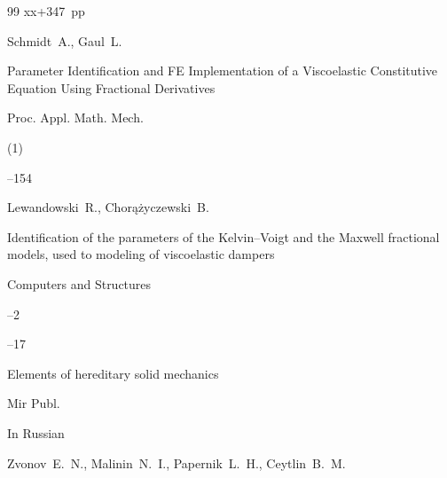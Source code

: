 \documentclass[11pt,a4paper,twoside]{article}
\begin{document}
\begin{thebibliography}{99}
\totalpages xx+347~pp











\by Schmidt~A., Gaul~L.


\paper Parameter Identification and FE Implementation of a Viscoelastic Constitutive Equation Using Fractional Derivatives


\jour Proc. Appl. Math. Mech.


(1)




--154









\by Lewandowski~R., \Russian Chor\k{a}\.zyczewski~B.


\paper  Identification of the parameters of the Kelvin--Voigt and the Maxwell fractional models, used to modeling of viscoelastic dampers 


\jour Computers and Structures




--2




--17











\book Elements of hereditary solid mechanics


\publaddr 


\publ Mir Publ.














\lang In Russian


\by	Zvonov~E.~N., Malinin~N.~I., Papernik~L.~H., Ceytlin~B.~M.



\end{thebibliography}
\end{document}
